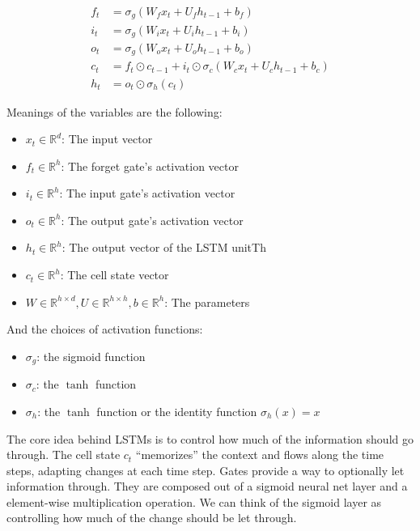         \begin{align*}
            f_t &= \sigma_g(W_fx_t + U_fh_{t-1} + b_f) \\
            i_t &= \sigma_g(W_ix_t + U_ih_{t-1} + b_i) \\
            o_t &= \sigma_g(W_ox_t + U_oh_{t-1} + b_o) \\
            c_t &= f_t \odot c_{t-1} + i_t \odot \sigma_c(W_cx_t + U_ch_{t-1} + b_c) \\
            h_t &= o_t \odot \sigma_h(c_t)
        \end{align*}

        Meanings of the variables are the following:

        \begin{itemize}
            \item $x_t \in \mathbb{R}^d$: The input vector
            \item $f_t \in \mathbb{R}^h$: The forget gate's activation vector
            \item $i_t \in \mathbb{R}^h$: The input gate's activation vector
            \item $o_t \in \mathbb{R}^h$: The output gate's activation vector
            \item $h_t \in \mathbb{R}^h$: The output vector of the LSTM unitTh
            \item $c_t \in \mathbb{R}^h$: The cell state vector
            \item $W \in \mathbb{R}^{h \times d}, U \in \mathbb{R}^{h \times h}, b \in \mathbb{R}^{h}$: 
                The parameters
        \end{itemize}

        And the choices of activation functions:

        \begin{itemize}
            \item $\sigma_g$: the sigmoid function
            \item $\sigma_c$: the $\tanh$ function
            \item $\sigma_h$: the $\tanh$ function or the identity function $\sigma_h(x) = x$
        \end{itemize}

        The core idea behind LSTMs is to control how much of the information should go through. \cite{Ola2015}
        The cell state $c_t$ ``memorizes'' the context and flows along the time steps,
        adapting changes at each time step.
        Gates provide a way to optionally let information through.
        They are composed out of a sigmoid neural net layer and a element-wise multiplication operation.
        We can think of the sigmoid layer as controlling how much of the change should be let through.

